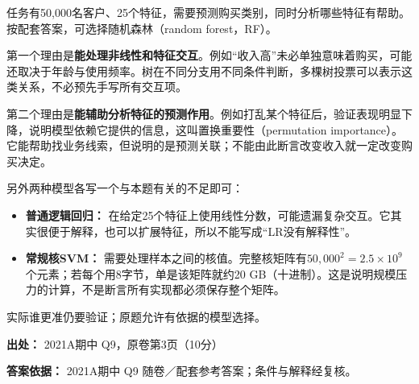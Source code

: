 任务有50,000名客户、25个特征，需要预测购买类别，同时分析哪些特征有帮助。按配套答案，可选择随机森林（random forest，RF）。


第一个理由是\textbf{能处理非线性和特征交互}。例如“收入高”未必单独意味着购买，可能还取决于年龄与使用频率。树在不同分支用不同条件判断，多棵树投票可以表示这类关系，不必预先手写所有交互项。


第二个理由是\textbf{能辅助分析特征的预测作用}。例如打乱某个特征后，验证表现明显下降，说明模型依赖它提供的信息，这叫置换重要性（permutation importance）。它能帮助找业务线索，但说明的是预测关联；不能由此断言改变收入就一定改变购买决定。


另外两种模型各写一个与本题有关的不足即可：



\begin{itemize}

\item \textbf{普通逻辑回归：} 在给定25个特征上使用线性分数，可能遗漏复杂交互。它其实很便于解释，也可以扩展特征，所以不能写成“LR没有解释性”。

\item \textbf{常规核SVM：} 需要处理样本之间的核值。完整核矩阵有\(50{,}000^2=2.5\times10^9\)个元素；若每个用8字节，单是该矩阵就约20 GB（十进制）。这是说明规模压力的计算，不是断言所有实现都必须保存整个矩阵。

\end{itemize}


实际谁更准仍要验证；原题允许有依据的模型选择。


\textbf{出处：} 2021A期中 Q9，原卷第3页（10分）


\textbf{答案依据：} 2021A期中 Q9 随卷／配套参考答案；条件与解释经复核。
